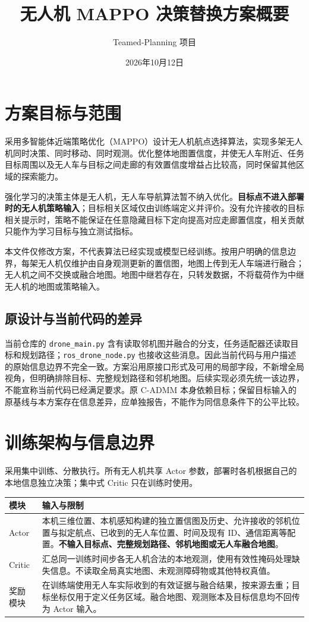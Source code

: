 \documentclass[UTF8,a4paper,11pt,fontset=fandol]{ctexart}
\title{无人机 MAPPO 决策替换方案概要}
\author{Teamed-Planning 项目}
\date{2026年10月12日}
\begin{document}
\maketitle

\section{方案目标与范围}
采用多智能体近端策略优化（MAPPO）设计无人机航点选择算法，实现多架无人机同时决策、同时移动、同时观测。优化整体地图置信度，并使无人车附近、任务目标周围以及无人车与目标之间走廊的有效置信度增益占比较高，同时保留其他区域的探索能力。

强化学习的决策主体是无人机，无人车导航算法暂不纳入优化。\textbf{目标点不进入部署时的无人机策略输入}；目标相关区域仅由训练端定义并评价。没有允许接收的目标相关提示时，策略不能保证在任意隐藏目标下定向提高对应走廊置信度，相关贡献只能作为学习目标与独立测试指标。

本文件仅修改方案，不代表算法已经实现或模型已经训练。按用户明确的信息边界，每架无人机仅维护由自身观测更新的置信图，地图上传到无人车端进行融合；无人机之间不交换或融合地图。地图中继若存在，只转发数据，不将载荷作为中继无人机的地图或策略输入。

\subsection{原设计与当前代码的差异}
当前仓库的 \texttt{drone\_main.py} 含有读取邻机图并融合的分支，任务适配器还读取目标和规划路径；\texttt{ros\_drone\_node.py} 也接收这些消息。因此当前代码与用户描述的原始信息边界不完全一致。方案沿用原接口形式及可用的局部字段，不新增全局视角，但明确排除目标、完整规划路径和邻机地图。后续实现必须先统一该边界，不能宣称当前代码已经满足要求。原 C-ADMM 本身依赖目标；保留目标输入的原基线与本方案存在信息差异，应单独报告，不能作为同信息条件下的公平比较。

\section{训练架构与信息边界}
采用集中训练、分散执行。所有无人机共享 Actor 参数，部署时各机根据自己的本地信息独立决策；集中式 Critic 只在训练时使用。

\begin{table}[htbp]
\centering
\begin{tabularx}{\textwidth}{@{}p{2.4cm}X@{}}
\toprule
模块 & 输入与限制 \\
\midrule
Actor & 本机三维位置、本机感知构建的独立置信图及历史、允许接收的邻机位置与拟定航点、已收到的无人车位置、时间及现有 ID、通信距离等配置。\textbf{不输入目标点、完整规划路径、邻机地图或无人车融合地图}。\\
Critic & 汇总同一训练时间步各无人机合法的本地观测，使用有效性掩码处理缺失信息。不读取全局真实地图、未观测障碍物或其他特权真值。\\
奖励模块 & 在训练端使用无人车实际收到的有效证据与融合结果，按来源去重；目标坐标仅用于定义任务区域。融合地图、观测账本及目标信息均不回传为 Actor 输入。\\
\bottomrule
\end{tabularx}
\end{table}
\end{document}
